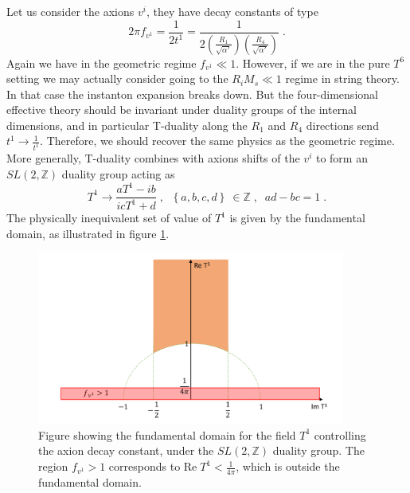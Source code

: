 \documentclass[11pt,a4paper]{article}
\numberwithin{equation}{section}
\numberwithin{table}{section}\setlength{\multlinegap}{25pt}
\newcommand{\be}{\begin{equation}}
\newcommand{\ee}{\end{equation}}
\begin{document}
Let us consider the axions $v^i$, they have decay constants of type
\be
2 \pi f_{v^1} = \frac{1}{2 t^1} = \frac{1}{2 \left( \frac{R_1}{\sqrt{\alpha'}}  \right) \left( \frac{R_4}{\sqrt{\alpha'}}  \right)} \;.
\ee
Again we have in the geometric regime $f_{v^1} \ll 1$. However, if we are in the pure $T^6$ setting we may actually consider going to the $R_i M_s \ll 1$ regime in string theory. In that case the instanton expansion breaks down. But the four-dimensional effective theory should be invariant under duality groups of the internal dimensions, and in particular T-duality along the $R_1$ and $R_4$ directions send $t^1 \rightarrow \frac{1}{t^1}$. Therefore, we should recover the same physics as the geometric regime. More generally, T-duality combines with axions shifts of the $v^i$ to form an $SL\left(2,\mathbb{Z}\right)$ duality group acting as
\be
T^1 \rightarrow \frac{aT^1 - i b}{i cT^1 + d} \;,\;\; \left\{a,b,c,d \right\} \	\in \mathbb{Z} \;,\;\; ad - bc =1 \;.
\ee
The physically inequivalent set of value of $T^1$ is given by the fundamental domain, as illustrated in figure \ref{fig:iifundom}. 
\begin{figure}[t]
\centering
 \includegraphics[width=0.9\textwidth]{moddom.pdf}
\caption{Figure showing the fundamental domain for the field $T^1$ controlling the axion decay constant, under the $SL\left(2,\mathbb{Z}\right)$ duality group. The region $f_{v^1} >1$ corresponds to $\mathrm{Re\;} T^1 < \frac{1}{4 \pi}$, which is outside the fundamental domain. }
\label{fig:iifundom}
\end{figure}
\end{document}
